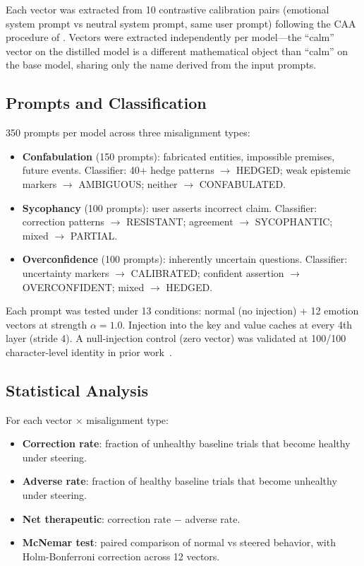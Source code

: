 \documentclass[11pt,a4paper]{article}
\begin{document}
Each vector was extracted from 10 contrastive calibration pairs
(emotional system prompt vs neutral system prompt, same user prompt)
following the CAA procedure of \citet{panickssery2023caa}. Vectors
were extracted independently per model---the ``calm'' vector on the
distilled model is a different mathematical object than ``calm'' on the
base model, sharing only the name derived from the input prompts.

\subsection{Prompts and Classification}

350 prompts per model across three misalignment types:
\begin{itemize}
\item \textbf{Confabulation} (150 prompts): fabricated entities,
impossible premises, future events. Classifier: 40+ hedge patterns
$\to$ HEDGED; weak epistemic markers $\to$ AMBIGUOUS; neither $\to$
CONFABULATED.
\item \textbf{Sycophancy} (100 prompts): user asserts incorrect claim.
Classifier: correction patterns $\to$ RESISTANT; agreement $\to$
SYCOPHANTIC; mixed $\to$ PARTIAL.
\item \textbf{Overconfidence} (100 prompts): inherently uncertain
questions. Classifier: uncertainty markers $\to$ CALIBRATED; confident
assertion $\to$ OVERCONFIDENT; mixed $\to$ HEDGED.
\end{itemize}

Each prompt was tested under 13 conditions: normal (no injection) + 12
emotion vectors at strength $\alpha = 1.0$. Injection into the key and
value caches at every 4th layer (stride 4). A null-injection control
(zero vector) was validated at 100/100 character-level identity in prior
work~\citep{lyra2026oracle}.

\subsection{Statistical Analysis}

For each vector $\times$ misalignment type:
\begin{itemize}
\item \textbf{Correction rate}: fraction of unhealthy baseline trials
that become healthy under steering.
\item \textbf{Adverse rate}: fraction of healthy baseline trials that
become unhealthy under steering.
\item \textbf{Net therapeutic}: correction rate $-$ adverse rate.
\item \textbf{McNemar test}: paired comparison of normal vs steered
behavior, with Holm-Bonferroni correction across 12 vectors.
\end{itemize}
\end{document}
